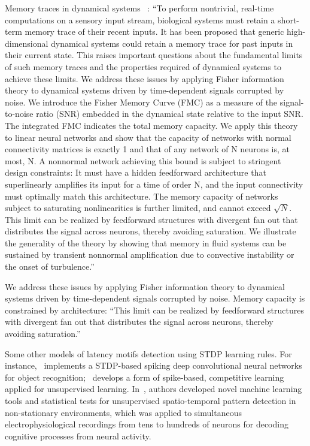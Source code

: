 \documentclass[brainsci, %
               review,submit,pdftex,moreauthors%
               ]{Definitions/mdpi}
\begin{document}
Memory traces in dynamical systems~\citep{ganguli_memory_2008} : ``To perform nontrivial, real-time computations on a sensory input stream, biological systems must retain a short-term memory trace of their recent inputs. It has been proposed that generic high-dimensional dynamical systems could retain a memory trace for past inputs in their current state. This raises important questions about the fundamental limits of such memory traces and the properties required of dynamical systems to achieve these limits. We address these issues by applying Fisher information theory to dynamical systems driven by time-dependent signals corrupted by noise. We introduce the Fisher Memory Curve (FMC) as a measure of the signal-to-noise ratio (SNR) embedded in the dynamical state relative to the input SNR. The integrated FMC indicates the total memory capacity. We apply this theory to linear neural networks and show that the capacity of networks with normal connectivity matrices is exactly 1 and that of any network of N neurons is, at most, N. A nonnormal network achieving this bound is subject to stringent design constraints: It must have a hidden feedforward architecture that superlinearly amplifies its input for a time of order N, and the input connectivity must optimally match this architecture. The memory capacity of networks subject to saturating nonlinearities is further limited, and cannot exceed $\sqrt N$. This limit can be realized by feedforward structures with divergent fan out that distributes the signal across neurons, thereby avoiding saturation. We illustrate the generality of the theory by showing that memory in fluid systems can be sustained by transient nonnormal amplification due to convective instability or the onset of turbulence.''

We address these issues by applying Fisher information theory to dynamical systems driven by time-dependent signals corrupted by noise. Memory capacity is constrained by architecture: ``This limit can be realized by feedforward structures with divergent fan out that distributes the signal across neurons, thereby avoiding saturation.''



Some other models of latency motifs detection using STDP learning rules. For instance,~\citep{kheradpisheh_stdp-based_2018} implements a STDP-based spiking deep convolutional neural networks for object recognition;~\citep{tavanaei_representation_2018} develops a form of spike-based, competitive learning applied for unsupervised learning. In~\citep{russo_cell_2017}, authors developed novel machine learning tools and statistical tests for unsupervised spatio-temporal pattern detection in non-stationary environments, which was applied to simultaneous electrophysiological recordings from tens to hundreds of neurons for decoding cognitive processes from neural activity.
\end{document}
